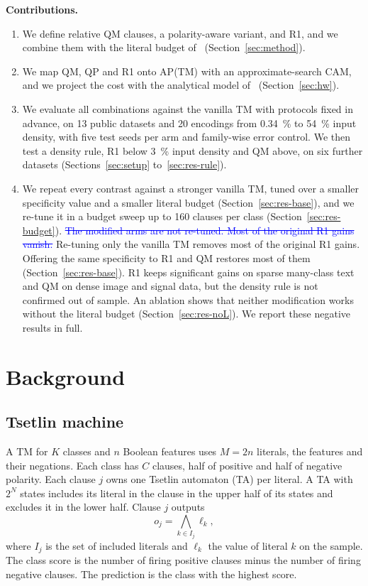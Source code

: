 \documentclass[preprint,12pt,times]{elsarticle}
\newcommand{\add}[1]{{\color{blue}#1}}
\newcommand{\del}[1]{\textcolor{blue}{\sout{#1}}}
\begin{document}
\textbf{Contributions.}
\begin{enumerate}
\item We define relative QM clauses, a polarity-aware variant, and R1, and we combine them with the literal budget of~\cite{abeyrathna2023csc} (Section~\ref{sec:method}).
\item We map QM\add{, QP} and R1 onto AP(TM) with an approximate-search CAM, and we project the cost with the analytical model of~\cite{shrot2026aptm} (Section~\ref{sec:hw}).
\item We evaluate all combinations against the vanilla TM with protocols fixed in advance, on 13 public datasets and 20 encodings from \SI{0.34}{\percent} to \SI{54}{\percent} input density, with five test seeds per arm and family-wise error control. We then test a density rule, R1 below \SI{3}{\percent} input density and QM above, on six further datasets (Sections~\ref{sec:setup} to~\ref{sec:res-rule}).
\item We repeat every contrast against a stronger vanilla TM, tuned over a smaller specificity value and a smaller literal budget (Section~\ref{sec:res-base}), and we re-tune it in a budget sweep up to 160 clauses per class (Section~\ref{sec:res-budget}). \del{The modified arms are not re-tuned. Most of the original R1 gains vanish.} \add{Re-tuning only the vanilla TM removes most of the original R1 gains. Offering the same specificity to R1 and QM restores most of them (Section~\ref{sec:res-base}).} R1 keeps significant gains on sparse many-class text and QM on dense image and signal data, but the density rule is not confirmed out of sample. \add{An ablation shows that neither modification works without the literal budget (Section~\ref{sec:res-noL}).} We report these negative results in full.
\end{enumerate}

\section{Background}
\label{sec:bg}

\subsection{Tsetlin machine}
A TM for $K$ classes and $n$ Boolean features uses $M = 2n$ literals, the features and their negations.
Each class has $C$ clauses, half of positive and half of negative polarity.
Each clause $j$ owns one Tsetlin automaton (TA) per literal.
A TA with $2^N$ states includes its literal in the clause in the upper half of its states and excludes it in the lower half.
Clause $j$ outputs
\begin{equation}
o_j = \bigwedge_{k \in I_j} \ell_k,
\label{eq:and}
\end{equation}
where $I_j$ is the set of included literals and $\ell_k$ the value of literal $k$ on the sample.
The class score is the number of firing positive clauses minus the number of firing negative clauses.
The prediction is the class with the highest score.
\end{document}
